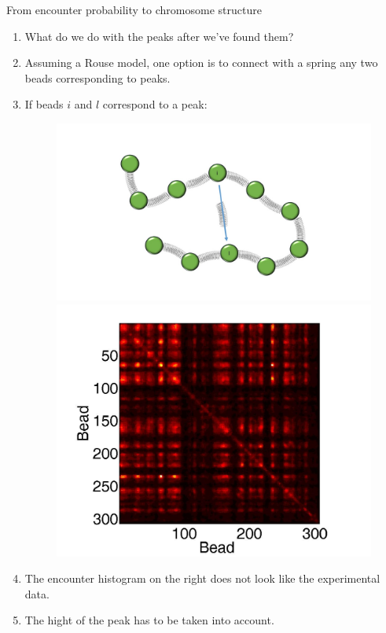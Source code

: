 \documentclass[8pt]{beamer}
\begin{document}
\begin{frame}{From encounter probability to chromosome structure}
\begin{enumerate}
\item What do we do with the peaks after we've found them?
\item Assuming a Rouse model, one option is to connect with a spring any two beads corresponding to peaks.
\item If beads $i$ and $l$ correspond to a peak: 
\begin{figure}[H]
\includegraphics[scale=0.15]{connectBeadsCorrespondingToPeaks}
\includegraphics[scale=0.07]{EncounterHistogramLoopsCorrespondingToPeaksExperimentalData}
\end{figure}
\item The encounter histogram on the right does not look like the experimental data. 
\item The hight of the peak has to be taken into account. 
\end{enumerate}
\end{frame}
\end{document}
